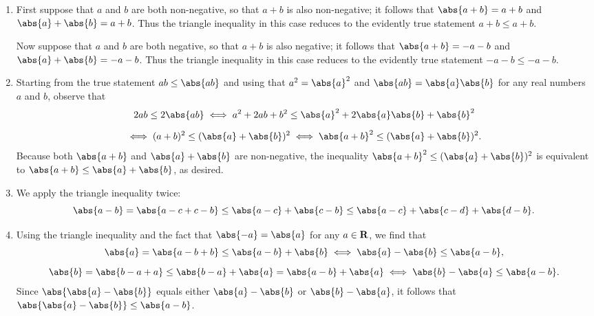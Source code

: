 \documentclass{lew98_solutions}
\begin{document}
\begin{solution}
    \begin{enumerate}
        \item First suppose that \( a \) and \( b \) are both non-negative, so that \( a + b \) is also non-negative; it follows that \( \abs{a + b} = a + b \) and \( \abs{a} + \abs{b} = a + b \). Thus the triangle inequality in this case reduces to the evidently true statement \( a + b \leq a + b \).

        Now suppose that \( a \) and \( b \) are both negative, so that \( a + b \) is also negative; it follows that \( \abs{a + b} = -a - b \) and \( \abs{a} + \abs{b} = -a - b \). Thus the triangle inequality in this case reduces to the evidently true statement \( -a - b \leq -a - b \).

        \item Starting from the true statement \( ab \leq \abs{ab} \) and using that \( a^2 = \abs{a}^2 \) and \( \abs{ab} = \abs{a} \abs{b} \) for any real numbers \( a \) and \( b \), observe that
        \begin{multline*}
            2ab \leq 2 \abs{ab} \iff a^2 + 2ab + b^2 \leq \abs{a}^2 + 2 \abs{a} \abs{b} + \abs{b}^2 \\[2mm]
            \iff (a + b)^2 \leq (\abs{a} + \abs{b})^2 \iff \abs{a + b}^2 \leq (\abs{a} + \abs{b})^2.
        \end{multline*}
        Because both \( \abs{a + b} \) and \( \abs{a} + \abs{b} \) are non-negative, the inequality \( \abs{a + b}^2 \leq (\abs{a} + \abs{b})^2\) is equivalent to \( \abs{a + b} \leq \abs{a} + \abs{b} \), as desired.

        \item We apply the triangle inequality twice:
        \[
            \abs{a - b} = \abs{a - c + c - b} \leq \abs{a - c} + \abs{c - b} \leq \abs{a - c} + \abs{c - d} + \abs{d - b}.
        \]

        \item Using the triangle inequality and the fact that \( \abs{-a} = \abs{a} \) for any \( a \in \mathbf{R} \), we find that
        \begin{gather*}
            \abs{a} = \abs{a - b + b} \leq \abs{a - b} + \abs{b} \iff \abs{a} - \abs{b} \leq \abs{a - b}, \\[2mm]
            \abs{b} = \abs{b - a + a} \leq \abs{b - a} + \abs{a} = \abs{a - b} + \abs{a} \iff \abs{b} - \abs{a} \leq \abs{a - b}.
        \end{gather*}
        Since \( \abs{\abs{a} - \abs{b}} \) equals either \( \abs{a} - \abs{b} \) or \( \abs{b} - \abs{a} \), it follows that \( \abs{\abs{a} - \abs{b}} \leq \abs{a - b} \).
    \end{enumerate}
\end{solution}
\end{document}
